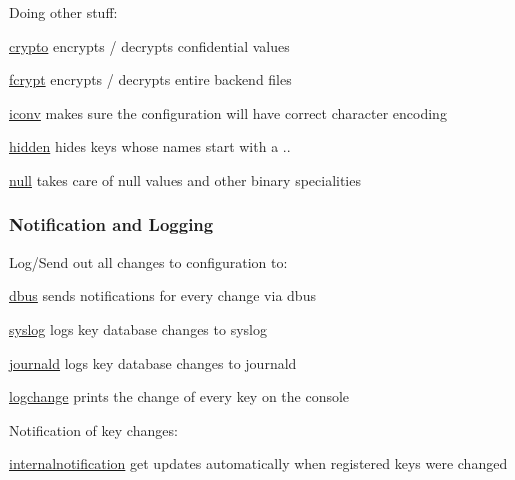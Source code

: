 Doing other stuff\+:


\begin{DoxyItemize}
\item \hyperlink{md_src_plugins_crypto_README_src_plugins_crypto_README_md}{crypto} encrypts / decrypts confidential values
\item \hyperlink{md_src_plugins_fcrypt_README_src_plugins_fcrypt_README_md}{fcrypt} encrypts / decrypts entire backend files
\item \hyperlink{md_src_plugins_iconv_README_src_plugins_iconv_README_md}{iconv} makes sure the configuration will have correct character encoding
\item \hyperlink{md_src_plugins_hidden_README_src_plugins_hidden_README_md}{hidden} hides keys whose names start with a {\ttfamily .}.
\item \hyperlink{md_src_plugins_null_README_src_plugins_null_README_md}{null} takes care of null values and other binary specialities
\end{DoxyItemize}

\subsubsection*{Notification and Logging}

Log/\+Send out all changes to configuration to\+:


\begin{DoxyItemize}
\item \hyperlink{md_src_plugins_dbus_README_src_plugins_dbus_README_md}{dbus} sends notifications for every change via dbus
\item \hyperlink{md_src_plugins_syslog_README_src_plugins_syslog_README_md}{syslog} logs key database changes to syslog
\item \hyperlink{md_src_plugins_journald_README_src_plugins_journald_README_md}{journald} logs key database changes to journald
\item \hyperlink{md_src_plugins_logchange_README_src_plugins_logchange_README_md}{logchange} prints the change of every key on the console
\end{DoxyItemize}

Notification of key changes\+:


\begin{DoxyItemize}
\item \hyperlink{md_src_plugins_internalnotification_README_src_plugins_internalnotification_README_md}{internalnotification} get updates automatically when registered keys were changed
\end{DoxyItemize}

